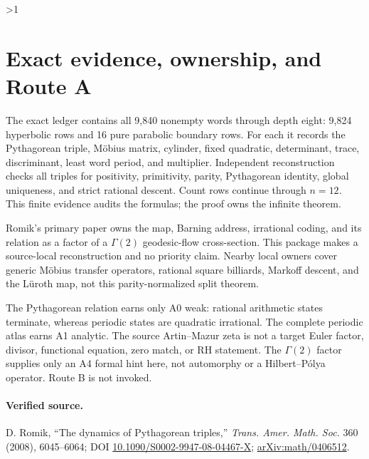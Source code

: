 \documentclass[10pt]{article}
\providecommand{\CRevisionRound}{2}
\begin{document}
\ifnum\CRevisionRound>1
\section{Exact evidence, ownership, and Route A}
The exact ledger contains all 9,840 nonempty words through depth eight: 9,824
hyperbolic rows and 16 pure parabolic boundary rows.  For each it records the
Pythagorean triple, M\"obius matrix, cylinder, fixed quadratic, determinant,
trace, discriminant, least word period, and multiplier.  Independent
reconstruction checks all triples for positivity, primitivity, parity,
Pythagorean identity, global uniqueness, and strict rational descent.  Count
rows continue through $n=12$.  This finite evidence audits the formulas; the
proof owns the infinite theorem.

Romik's primary paper owns the map, Barning address, irrational coding, and
its relation as a factor of a $\Gamma(2)$ geodesic-flow cross-section.  This
package makes a source-local reconstruction and no priority claim.  Nearby
local owners cover generic M\"obius transfer operators, rational square
billiards, Markoff descent, and the L\"uroth map, not this parity-normalized
split theorem.

The Pythagorean relation earns only A0 weak: rational arithmetic states
terminate, whereas periodic states are quadratic irrational.  The complete
periodic atlas earns A1 analytic.  The source Artin--Mazur zeta is not a target
Euler factor, divisor, functional equation, zero match, or RH statement.  The
$\Gamma(2)$ factor supplies only an A4 formal hint here, not automorphy or a
Hilbert--P\'olya operator.  Route B is not invoked.
\fi

\paragraph{Verified source.}
\scriptsize
\raggedright
\noindent D. Romik, ``The dynamics of Pythagorean triples,'' \emph{Trans.
Amer. Math. Soc.} 360 (2008), 6045--6064; DOI
\href{https://doi.org/10.1090/S0002-9947-08-04467-X}{10.1090/S0002-9947-08-04467-X};
\href{https://arxiv.org/abs/math/0406512}{arXiv:math/0406512}.
\end{document}
